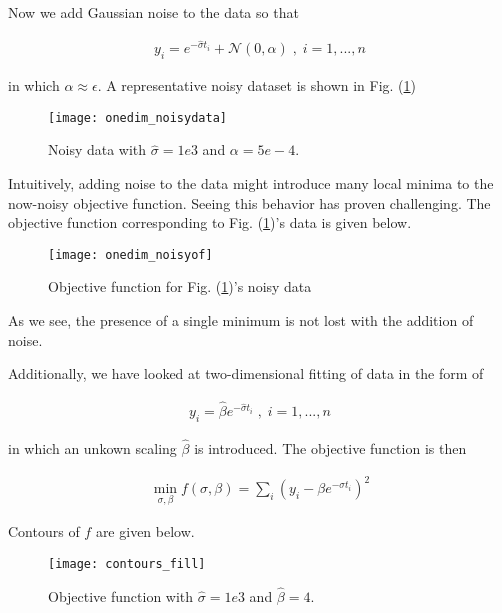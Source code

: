 \documentclass[12pt]{article}
\begin{document}
Now we add Gaussian noise to the data so that

\begin{align*}
  y_i = e^{-\hat{\sigma} t_i} + \mathcal{N}(0,\alpha) \;, \; i=1,...,n
\end{align*}

in which $\alpha \approx \epsilon$. A representative noisy dataset is shown in Fig. (\ref{noisydata})

\begin{figure}[h!]
  \texttt{[image: onedim\_noisydata]}
  \caption{Noisy data with $\hat{\sigma} = 1e3$ and $\alpha = 5e-4$.}
  \label{noisydata}
\end{figure}

Intuitively, adding noise to the data might introduce many local minima to the now-noisy objective function. Seeing this behavior has proven challenging. The objective function corresponding to Fig. (\ref{noisydata})'s data is given below.

\begin{figure}[h!]
  \texttt{[image: onedim\_noisyof]}
  \caption{Objective function for Fig. (\ref{noisydata})'s noisy data}
  \label{noisyof}
\end{figure}

As we see, the presence of a single minimum is not lost with the addition of noise.

\pagebreak

Additionally, we have looked at two-dimensional fitting of data in the form of 

\begin{align*}
  y_i = \hat{\beta} e^{-\hat{\sigma} t_i} \;, \; i=1,...,n
\end{align*}

in which an unkown scaling $\hat{\beta}$ is introduced. The objective function is then

\begin{align*}
  \min\limits_{\sigma, \beta} f(\sigma, \beta) =  \sum\limits_i (y_i - \beta e^{-\sigma t_i})^2
\end{align*}

Contours of $f$ are given below.

\begin{figure}[h!]
  \texttt{[image: contours\_fill]}
  \caption{Objective function with $\hat{\sigma} = 1e3$ and $\hat{\beta} = 4$.}
\end{figure}
\end{document}
